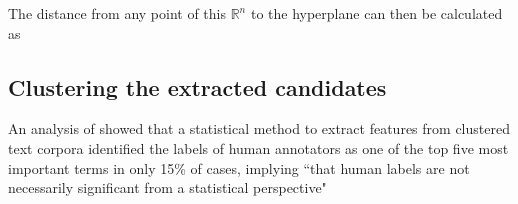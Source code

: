 The distance from any point of this $\mathds{R}^n$ to the hyperplane can then be calculated as 


\subsection{Clustering the extracted candidates}

An analysis of \cite{Carmel2009} showed that a statistical method to extract features from clustered text corpora identified the labels of human annotators as one of the top five most important terms in only 15\% of cases, implying ``that human labels are not necessarily significant from a statistical perspective" \cite[139]{Carmel2009}
